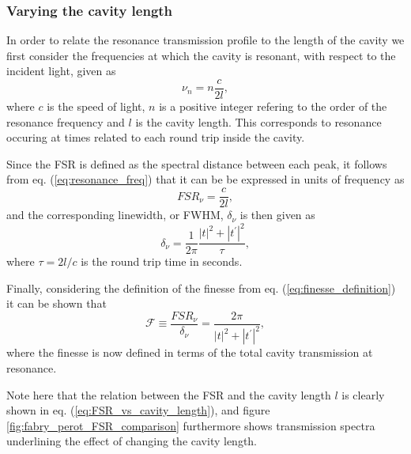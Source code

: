 \subsubsection{Varying the cavity length}

In order to relate the resonance transmission profile to the length of the cavity we first consider the frequencies at which the cavity is resonant, with respect to the incident light, given as
\begin{equation}
    \nu_n = n \frac{c}{2l},
    \label{eq:resonance_freq}
\end{equation}
where $c$ is the speed of light, $n$ is a positive integer refering to the order of the resonance frequency and $l$ is the cavity length. This corresponds to resonance occuring at times related to each round trip inside the cavity. 

Since the FSR is defined as the spectral distance between each peak, it follows from eq. (\ref{eq:resonance_freq}) that it can be be expressed in units of frequency as 
\begin{equation}
    FSR_{\nu} = \frac{c}{2l},
    \label{eq:FSR_vs_cavity_length}
\end{equation}
and the corresponding linewidth, or FWHM, $\delta_{\nu}$ is then given as
\begin{equation}
    \delta_{\nu} = \frac{1}{2 \pi} \frac{|t|^2 + |t^{\prime}|^2}{\tau},
\end{equation}
where $\tau = 2l/c$ is the round trip time in seconds. 

Finally, considering the definition of the finesse from eq. (\ref{eq:finesse_definition}) it can be shown that
\begin{equation}
    \mathcal{F} \equiv \frac{FSR_{\nu}}{\delta_{\nu}} = \frac{2 \pi}{|t|^2 + |t^{\prime}|^2},
    \label{eq:lossless_finesse}
\end{equation}
where the finesse is now defined in terms of the total cavity transmission at resonance. 

Note here that the relation between the FSR and the cavity length $l$ is clearly shown in eq. (\ref{eq:FSR_vs_cavity_length}), and figure \ref{fig:fabry_perot_FSR_comparison} furthermore shows transmission spectra underlining the effect of changing the cavity length. 

